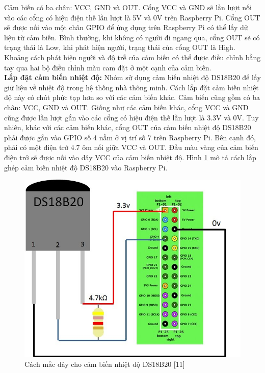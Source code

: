 \documentclass[12pt,a4paper,oneside]{extbook}
\begin{document}
\noindent
Cảm biến có ba chân: VCC, GND và OUT. Cổng VCC và GND sẽ lần lượt nối vào các cổng có hiệu điện thế lần lượt là 5V và 0V trên Raspberry Pi. Cổng OUT sẽ được nối vào một chân GPIO để ứng dụng trên Raspberry Pi có thể lấy dữ liệu từ cảm biến. Bình thường, khi không có người đi ngang qua, cổng OUT sẽ có trạng thái là Low, khi phát hiện người, trạng thái của cổng OUT là High. Khoảng cách phát hiện người và độ trễ của cảm biến có thể được điều chỉnh bằng tay qua hai bộ điều chỉnh màu cam đặt ở một cạnh của cảm biến.\\

\noindent
\textbf{Lắp đặt cảm biến nhiệt độ:} Nhóm sử dụng cảm biến nhiệt độ DS18B20 để lấy giữ liệu về nhiệt độ trong hệ thống nhà thông minh. Cách lắp đặt cảm biến nhiệt độ này có chút phức tạp hơn so với các cảm biến khác. Cảm biến cũng gồm có ba chân: VCC, GND và OUT. Giống như các cảm biến khác, cổng VCC và GND cũng được lần lượt gắn vào các cổng có hiệu điện thế lần lượt là 3.3V và 0V. Tuy nhiên, khác với các cảm biến khác, cổng OUT của cảm biến nhiệt độ DS18B20 phải được gắn vào GPIO số 4 nằm ở vị trí số 7 trên Raspberry Pi. Bên cạnh đó, phải có một điện trở 4.7 ôm nối giữa VCC và OUT. Đầu màu vàng của cảm biến điện trở sẽ được nối vào dây VCC của cảm biến nhiệt độ. Hình \ref{fig:6-temp-sensor} mô tả cách lắp ghép cảm biến nhiệt độ DS18B20 vào Raspberry Pi.

\begin{figure}[h]
  \centering
     \includegraphics[scale=0.3]{6-temp-sensor}
  \caption{Cách mắc dây cho cảm biến nhiệt độ DS18B20 [11]}\label{fig:6-temp-sensor}
\end{figure}
\end{document}
